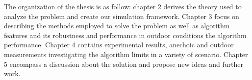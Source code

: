 The organization of the thesis is as follow: chapter 2 derives the theory used to analyze the problem and create our simulation framework. Chapter 3 focus on describing the methods employed to solve the problem as well as algorithm features and its robustness and performance in outdoor conditions the algorithm performance.
Chapter 4 contains experimental results, anechoic and outdoor measurements investigating the algorithm limits in a variety of scenario.
Chapter 5 encompass a discussion about the solution and propose new ideas and further work.




